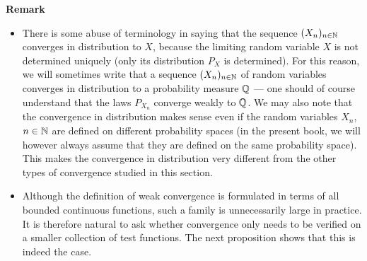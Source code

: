 \documentclass[../Main.tex]{subfiles}
\begin{document}
\textbf{Remark}
\begin{itemize}
\item There is some abuse of terminology in saying that the sequence $(X_n)_{n\in\mathbb{N}}$ converges in distribution to $X$, because the limiting random variable $X$ is not determined uniquely (only its distribution $P_X$ is determined). For this reason, we will sometimes write that a sequence $(X_n)_{n\in\mathbb{N}}$ of random variables converges in distribution to a probability measure $\mathbb{Q}$ --- one should of course understand that the laws $P_{X_n}$ converge weakly to $\mathbb{Q}$. We may also note that the convergence in distribution makes sense even if the random variables $X_n$, $n\in\mathbb{N}$ are defined on different probability spaces (in the present book, we will however always assume that they are defined on the same probability space). This makes the convergence in distribution very different from the other types of convergence studied in this section.
\item Although the definition of weak convergence is formulated in terms of all bounded continuous functions, such a family is unnecessarily large in practice. It is therefore natural to ask whether convergence only needs to be verified on a smaller collection of test functions. The next proposition shows that this is indeed the case.
\end{itemize}
\end{document}
